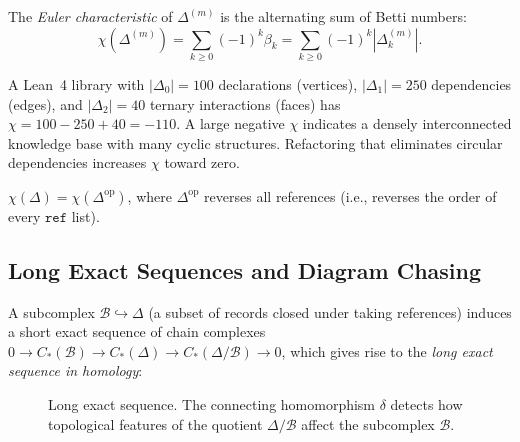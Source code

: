 \begin{definition}
\label{def:euler}
The \emph{Euler characteristic} of $\Delta^{(m)}$ is the alternating sum of Betti numbers:
\[
\chi(\Delta^{(m)}) = \sum_{k \geq 0} (-1)^k \beta_k = \sum_{k \geq 0} (-1)^k |\Delta^{(m)}_k|.
\]
\end{definition}

\begin{example}
A Lean~4 library with $|\Delta_0| = 100$ declarations (vertices), $|\Delta_1| = 250$ dependencies (edges), and $|\Delta_2| = 40$ ternary interactions (faces) has $\chi = 100 - 250 + 40 = -110$. A large negative $\chi$ indicates a densely interconnected knowledge base with many cyclic structures. Refactoring that eliminates circular dependencies increases $\chi$ toward zero.
\end{example}

\begin{theorem}
$\chi(\Delta) = \chi(\Delta^{\mathrm{op}})$, where $\Delta^{\mathrm{op}}$ reverses all references (i.e., reverses the order of every $\texttt{ref}$ list).
\end{theorem}



\subsection{Long Exact Sequences and Diagram Chasing}

A subcomplex $\mathcal{B} \hookrightarrow \Delta$ (a subset of records closed under taking references) induces a short exact sequence of chain complexes $0 \to C_*(\mathcal{B}) \to C_*(\Delta) \to C_*(\Delta/\mathcal{B}) \to 0$, which gives rise to the \emph{long exact sequence in homology}:

\begin{figure}[ht]
\centering
{}
\caption{Long exact sequence. The connecting homomorphism $\delta$ detects how topological features of the quotient $\Delta/\mathcal{B}$ affect the subcomplex $\mathcal{B}$.}
\label{fig:les}
\end{figure}

